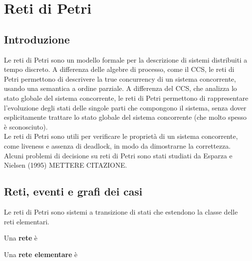 \chapter{Reti di Petri}
\section{Introduzione}
Le reti di Petri sono un modello formale per la descrizione di sistemi
distribuiti a tempo discreto. A differenza delle algebre di processo, come il CCS,
le reti di Petri permettono di descrivere la true concurrency di un
sistema concorrente, usando una semantica a ordine parziale.
A differenza del CCS, che analizza lo stato globale del sistema concorrente,
le reti di Petri permettono di rappresentare l'evoluzione degli stati
delle singole parti che compongono il sistema, senza dover esplicitamente
trattare lo stato globale del sistema concorrente (che molto spesso è
sconosciuto).\\
Le reti di Petri sono utili per verificare le proprietà di un sistema concorrente,
come liveness e assenza di deadlock, in modo da dimostrarne la correttezza.
Alcuni problemi di decisione su reti di Petri sono stati studiati da
Esparza e Nielsen (1995) METTERE CITAZIONE.

\section{Reti, eventi e grafi dei casi}
Le reti di Petri sono sistemi a transizione di stati che estendono la
classe delle reti elementari.
\begin{defn}
    Una \textbf{rete} è
\end{defn}

\begin{defn}
    Una \textbf{rete elementare} è
\end{defn}

